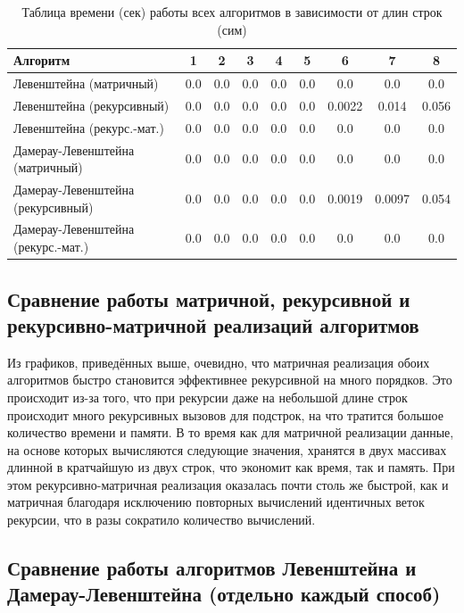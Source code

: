 \begin{table}[H]
    \centering
    \begin{tabular}{|l|c|c|c|c|c|c|c|c|}
        \hline
        \textbf{Алгоритм} & \textbf{1} & \textbf{2} & \textbf{3} & \textbf{4} & \textbf{5} & \textbf{6} & \textbf{7} & \textbf{8}\\
        \hline
        Левенштейна (матричный) & 0.0 & 0.0 & 0.0 & 0.0 & 0.0 & 0.0 & 0.0& 0.0 \\
        Левенштейна (рекурсивный) & 0.0 & 0.0 & 0.0 & 0.0 & 0.0 & 0.0022 & 0.014 & 0.056 \\
        Левенштейна (рекурс.-мат.) & 0.0 & 0.0 & 0.0 & 0.0 & 0.0 & 0.0 & 0.0 & 0.0 \\
        Дамерау-Левенштейна (матричный) & 0.0 & 0.0 & 0.0 & 0.0 & 0.0 & 0.0 & 0.0 & 0.0 \\
        Дамерау-Левенштейна (рекурсивный) & 0.0 & 0.0 & 0.0 & 0.0 & 0.0 & 0.0019 & 0.0097 & 0.054 \\
        Дамерау-Левенштейна (рекурс.-мат.) & 0.0 & 0.0 & 0.0 & 0.0 & 0.0 & 0.0 & 0.0 & 0.0 \\
        \hline
    \end{tabular}
    \caption{Таблица времени (сек) работы всех алгоритмов в зависимости от длин строк (сим)}
    \label{table:table_all}
\end{table}

\subsection{Сравнение работы матричной, рекурсивной и рекурсивно-матричной реализаций алгоритмов}

\hspace{1.25cm}
Из графиков, приведённых выше, очевидно, что матричная реализация обоих алгоритмов быстро становится эффективнее рекурсивной на много порядков. Это происходит из-за того, что при рекурсии даже на небольшой длине строк происходит много рекурсивных вызовов для подстрок, на что тратится большое количество времени и памяти. В то время как для матричной реализации данные, на основе которых вычисляются следующие значения, хранятся в двух массивах длинной в кратчайшую из двух строк, что экономит как время, так и память. При этом рекурсивно-матричная реализация оказалась почти столь же быстрой, как и матричная благодаря исключению повторных вычислений идентичных веток рекурсии, что в разы сократило количество вычислений.

\subsection{Сравнение работы алгоритмов Левенштейна и Дамерау-Левенштейна (отдельно каждый способ)}

